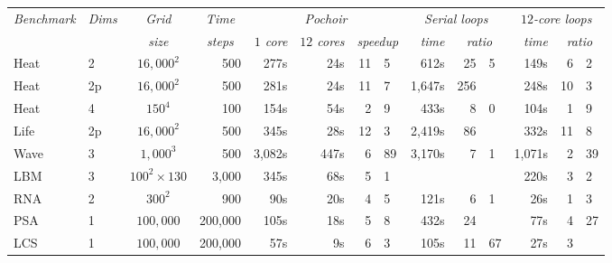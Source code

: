 \newcommand{\chead}[1]{\multicolumn{1}{c}{\textit{#1}}}
\newcommand{\fhead}[1]{\multicolumn{2}{c|}{\textit{#1}}}

\begin{figure*}
\center
\small
\begin{tabular}{|llcr|rrr@{.}l|rr@{.}l|rr@{.}l|}
\hline
\textit{Benchmark} & \textit{Dims}
& \textit{Grid} 
& \multicolumn{1}{c|}{\textit{Time}} 
& \multicolumn{4}{c|}{\textit{Pochoir}}
& \multicolumn{3}{c|}{\textit{Serial loops}}
& \multicolumn{3}{c|}{\textit{$12$-core loops}}
 \\ 
 &
 & \textit{size} & \multicolumn{1}{c|}{\textit{steps}}
& \textit{$1$ core} 
& \textit{$12$ cores}
& \fhead{speedup}
&\textit{time} & \fhead{ratio} & \textit{time} & \fhead{ratio} \\
\hline\hline
Heat    & 2  & $16,000^2$        &     500 &   277s &  24s & 11&5  &   612s &  25&5 &   149s &  6&2  \\
Heat    & 2p & $16,000^2$        &     500 &   281s &  24s & 11&7  & 1,647s & 256&  &   248s & 10&3  \\
Heat    & 4  & $150^4$           &     100 &   154s &  54s &  2&9  &   433s &   8&0 &   104s &  1&9  \\
Life    & 2p & $16,000^2$        &     500 &   345s &  28s & 12&3  & 2,419s &  86&  &   332s & 11&8  \\
Wave    & 3  & $1,000^3$         &     500 & 3,082s & 447s &  6&89 & 3,170s &   7&1 & 1,071s &  2&39 \\
LBM     & 3  & $100^2\times 130$ &   3,000 &   345s &  68s &  5&1  &        &    &  &   220s &  3&2  \\
RNA     & 2  & $300^2$           &     900 &    90s &  20s &  4&5  &   121s &   6&1 &    26s &  1&3  \\
PSA     & 1  & $100,000$         & 200,000 &   105s &  18s &  5&8  &   432s &  24&  &    77s &  4&27  \\
LCS     & 1  & $100,000$         & 200,000 &    57s &   9s &  6&3  &   105s &  11&67  &    27s &  3&  \\

\end{tabular}
\end{figure*}
